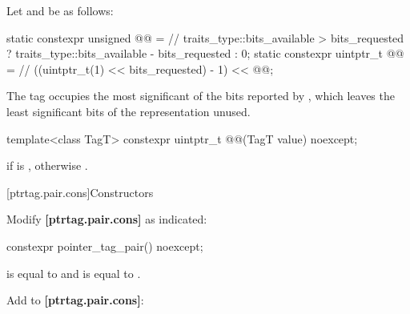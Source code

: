 \documentclass{wg21}
\newcommand{\editinstr}[1]{\textcolor{noteclr}{#1}}
\begin{document}
\begin{addedblock}

\pnum
Let  and  be as follows:
\begin{codeblock}
static constexpr unsigned @@ =  // \expos
  traits_type::bits_available > bits_requested ? traits_type::bits_available - bits_requested : 0;
static constexpr uintptr_t @@ =   // \expos
  ((uintptr_t(1) << bits_requested) - 1) << @@;
\end{codeblock}

\pnum
\begin{note}
The tag occupies the most significant of the bits reported by
,
which leaves the  least significant bits of
the representation unused.
\end{note}

%
\begin{itemdecl}
template<class TagT> constexpr uintptr_t @@(TagT value) noexcept;
\end{itemdecl}

\begin{itemdescr}
\pnum
\returns
{}
if  is ,
otherwise .
\end{itemdescr}

\end{addedblock}

[ptrtag.pair.cons]{Constructors}

\editinstr{Modify \textbf{[ptrtag.pair.cons]} as indicated:}

\begin{itemdecl}
constexpr pointer_tag_pair() noexcept;
\end{itemdecl}

\begin{itemdescr}
\pnum
\ensures
{} is equal to  and
 is equal to .
\end{itemdescr}

\ednote{[...]}

\editinstr{Add to \textbf{[ptrtag.pair.cons]}:}
\end{document}
